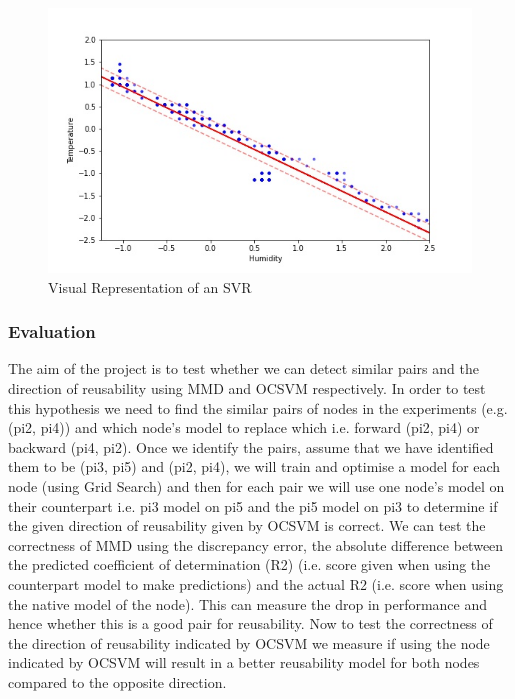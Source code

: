 \documentclass{mprop}
\begin{document}
\begin{figure}
\begin{center}
\includegraphics[scale=0.45]{SVR_representation.jpg}
\end{center}
\caption{\label{fig-SVRex}Visual Representation of an SVR}
\end{figure}

\subsubsection{Evaluation}

The aim of the project is to test whether we can detect similar pairs and the direction of reusability using MMD and OCSVM respectively. In order to test this hypothesis we need to find the similar pairs of nodes in the experiments (e.g. (pi2, pi4)) and which node's model to replace which i.e. forward (pi2, pi4) or backward (pi4, pi2). Once we identify the pairs, assume that we have identified them to be (pi3, pi5) and (pi2, pi4), we will train and optimise a model for each node (using Grid Search) and then for each pair we will use one node's model on their counterpart i.e. pi3 model on pi5 and the pi5 model on pi3 to determine if the given direction of reusability given by OCSVM is correct. We can test the correctness of MMD using the discrepancy error, the absolute difference between the predicted coefficient of determination (R2) (i.e. score given when using the counterpart model to make predictions) and the actual R2 (i.e. score when using the native model of the node). This can measure the drop in performance and hence whether this is a good pair for reusability. Now to test the correctness of the direction of reusability indicated by OCSVM we measure if using the node indicated by OCSVM will result in a better reusability model for both nodes compared to the opposite direction. 
\end{document}
